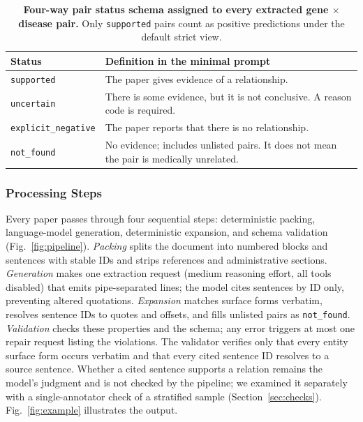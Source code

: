 \documentclass[preprint,10pt,letterpaper]{elsarticle}
\newcommand{\st}[1]{\texttt{#1}}             %
\begin{document}
\begin{table}[!htbp]
\centering\footnotesize
\caption{\textbf{Four-way pair status schema assigned to every extracted gene $\times$ disease pair.} Only \st{supported} pairs count as positive predictions under the default strict view.}
\label{tab:status}
\begin{tabularx}{\linewidth}{@{}lX@{}}
\toprule
Status & Definition in the minimal prompt\\
\midrule
\textcolor{stsup}{\st{supported}} & The paper gives evidence of a relationship.\\
\textcolor{stunc}{\st{uncertain}} & There is some evidence, but it is not conclusive. A reason code is required.\\
\textcolor{stneg}{\st{explicit\_negative}} & The paper reports that there is no relationship.\\
\textcolor{ink}{\st{not\_found}} & No evidence; includes unlisted pairs. It does not mean the pair is medically unrelated.\\
\bottomrule
\end{tabularx}
\end{table}

\subsubsection{Processing Steps}
Every paper passes through four sequential steps: deterministic packing, language-model generation, deterministic expansion, and schema validation (Fig.~\ref{fig:pipeline}). \emph{Packing} splits the document into numbered blocks and sentences with stable IDs and strips references and administrative sections. \emph{Generation} makes one extraction request (medium reasoning effort, all tools disabled) that emits pipe-separated lines; the model cites sentences by ID only, preventing altered quotations. \emph{Expansion} matches surface forms verbatim, resolves sentence IDs to quotes and offsets, and fills unlisted pairs as \st{not\_found}. \emph{Validation} checks these properties and the schema; any error triggers at most one repair request listing the violations. The validator verifies only that every entity surface form occurs verbatim and that every cited sentence ID resolves to a source sentence. Whether a cited sentence supports a relation remains the model's judgment and is not checked by the pipeline; we examined it separately with a single-annotator check of a stratified sample (Section~\ref{sec:checks}). Fig.~\ref{fig:example} illustrates the output.
\end{document}
